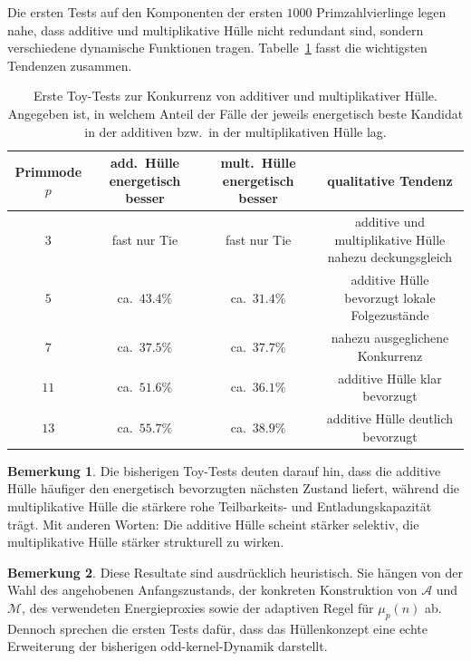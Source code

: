 \documentclass[11pt,a4paper]{article}
\theoremstyle{definition}
\newtheorem{bemerkung}{Bemerkung}
\begin{document}
Die ersten Tests auf den Komponenten der ersten \(1000\) Primzahlvierlinge legen nahe, dass additive und multiplikative Hülle nicht redundant sind, sondern verschiedene dynamische Funktionen tragen. Tabelle~\ref{tab:huellen-tests} fasst die wichtigsten Tendenzen zusammen.

\begin{table}[h]
	\centering
	\begin{tabular}{cccc}
		\hline
		Primmode \(p\) & add.\ Hülle energetisch besser & mult.\ Hülle energetisch besser & qualitative Tendenz \\
		\hline
		\(3\)  & fast nur Tie & fast nur Tie & additive und multiplikative Hülle nahezu deckungsgleich \\
		\(5\)  & ca.\ \(43.4\%\) & ca.\ \(31.4\%\) & additive Hülle bevorzugt lokale Folgezustände \\
		\(7\)  & ca.\ \(37.5\%\) & ca.\ \(37.7\%\) & nahezu ausgeglichene Konkurrenz \\
		\(11\) & ca.\ \(51.6\%\) & ca.\ \(36.1\%\) & additive Hülle klar bevorzugt \\
		\(13\) & ca.\ \(55.7\%\) & ca.\ \(38.9\%\) & additive Hülle deutlich bevorzugt \\
		\hline
	\end{tabular}
	\caption{Erste Toy-Tests zur Konkurrenz von additiver und multiplikativer Hülle. Angegeben ist, in welchem Anteil der Fälle der jeweils energetisch beste Kandidat in der additiven bzw.\ in der multiplikativen Hülle lag.}
	\label{tab:huellen-tests}
\end{table}

\begin{bemerkung}
	Die bisherigen Toy-Tests deuten darauf hin, dass die additive Hülle häufiger den energetisch bevorzugten nächsten Zustand liefert, während die multiplikative Hülle die stärkere rohe Teilbarkeits- und Entladungskapazität trägt. Mit anderen Worten: Die additive Hülle scheint stärker selektiv, die multiplikative Hülle stärker strukturell zu wirken.
\end{bemerkung}

\begin{bemerkung}
	Diese Resultate sind ausdrücklich heuristisch. Sie hängen von der Wahl des angehobenen Anfangszustands, der konkreten Konstruktion von \(\mathcal{A}\) und \(\mathcal{M}\), des verwendeten Energieproxies sowie der adaptiven Regel für \(\mu_p(n)\) ab. Dennoch sprechen die ersten Tests dafür, dass das Hüllenkonzept eine echte Erweiterung der bisherigen odd-kernel-Dynamik darstellt.
\end{bemerkung}
\end{document}
